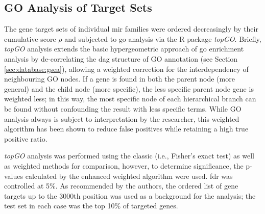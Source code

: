 \begin{method}
\subsection{GO Analysis of Target Sets} \label{sec:cellculture:topgo}
The gene target sets of individual \ac{mir} families were ordered decreasingly by their cumulative score $\rho$ and subjected to \ac{go} analysis via the R package \textit{topGO}.\cite{Alexa2006} Briefly, \textit{topGO} analysis extends the basic hypergeometric approach of \ac{go} enrichment analysis by de-correlating the \ac{dag} structure of GO annotation (see Section \ref{sec:database:gsea}), allowing a weighted correction for the interdependency of neighbouring GO nodes. If a gene is found in both the parent node (more general) and the child node (more specific), the less specific parent node gene is weighted less; in this way, the most specific node of each hierarchical branch can be found without confounding the result with less specific terms. While GO analysis always is subject to interpretation by the researcher, this weighted algorithm has been shown to reduce false positives while retaining a high true positive ratio.

\textit{topGO} analysis was performed using the classic (i.e., Fisher's exact test) as well as weighted methods for comparison, however, to determine significance, the p-values calculated by the enhanced weighted algorithm were used. \ac{fdr} was controlled at 5\%. As recommended by the authors,\cite{Alexa2006} the ordered list of gene targets up to the 3000th position was used as a background for the analysis; the test set in each case was the top 10\% of targeted genes.

\end{method}

